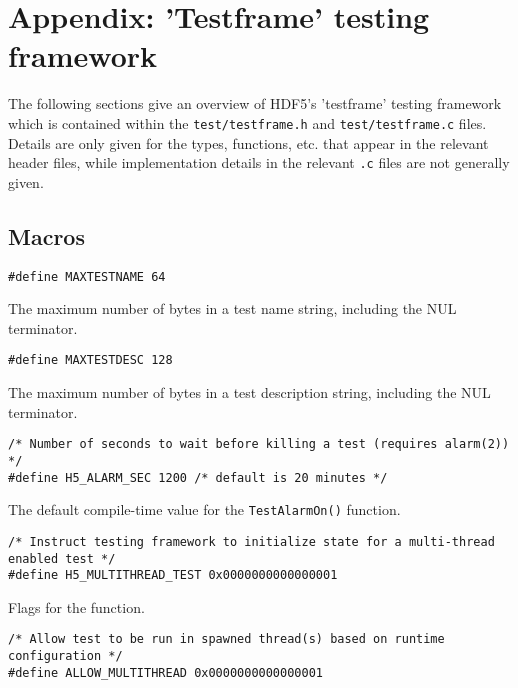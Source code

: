 \documentclass[../HDF5_RFC.tex]{subfiles}
\begin{document}
\newpage

\section{Appendix: 'Testframe' testing framework}
\label{apdx:test_frame}

The following sections give an overview of HDF5's 'testframe' testing framework which is contained
within the \texttt{test/testframe.h} and \texttt{test/testframe.c} files. Details are only given
for the types, functions, etc. that appear in the relevant header files, while implementation details
in the relevant \texttt{.c} files are not generally given.

\subsection{Macros}

\begin{verbatim}
#define MAXTESTNAME 64
\end{verbatim}

The maximum number of bytes in a test name string, including the NUL terminator.

\begin{verbatim}
#define MAXTESTDESC 128
\end{verbatim}

The maximum number of bytes in a test description string, including the NUL terminator.

\begin{verbatim}
/* Number of seconds to wait before killing a test (requires alarm(2)) */
#define H5_ALARM_SEC 1200 /* default is 20 minutes */
\end{verbatim}

The default compile-time value for the \texttt{TestAlarmOn()} function.

\begin{verbatim}
/* Instruct testing framework to initialize state for a multi-thread
enabled test */
#define H5_MULTITHREAD_TEST 0x0000000000000001
\end{verbatim}

Flags for the  function.

\begin{verbatim}
/* Allow test to be run in spawned thread(s) based on runtime
configuration */
#define ALLOW_MULTITHREAD 0x0000000000000001
\end{verbatim}
\end{document}
